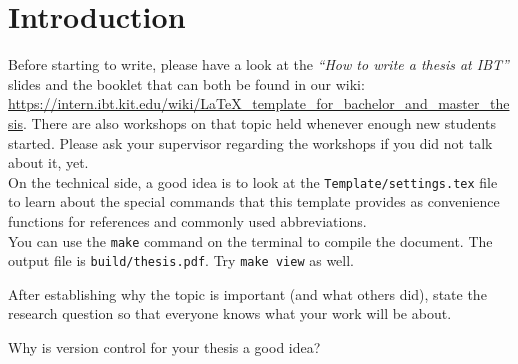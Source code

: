 \chapter{Introduction}
\label{chap:introduction}

Before starting to write, please have a look at the \textit{``How to write a thesis at IBT''} slides and the booklet that can both be found in our wiki: \url{https://intern.ibt.kit.edu/wiki/LaTeX_template_for_bachelor_and_master_thesis}.
There are also workshops on that topic held whenever enough new students started. Please ask your supervisor regarding the workshops if you did not talk about it, yet.\\

On the technical side, a good idea is to look at the \texttt{Template/settings.tex} file to learn about the special commands that this template provides as convenience functions for references and commonly used abbreviations.\\

You can use the \texttt{make} command on the terminal to compile the document. The output file is \texttt{build/thesis.pdf}. Try \texttt{make view} as well.

After establishing why the topic is important (and what others did), state the 
research question so that everyone knows what your work will be about.

\begin{tcolorbox}[colback=white,colframe=kitgreen,width=\linewidth,flush 
    right,title={Research question}]
    Why is version control for your thesis a good idea?
\end{tcolorbox}
